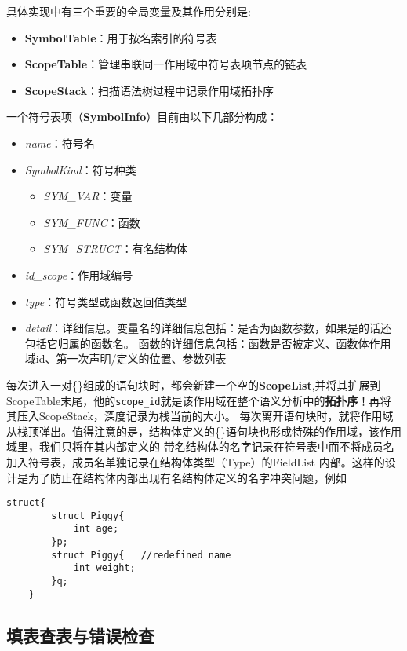 \documentclass[twocolumn]{article}
\begin{document}
具体实现中有三个重要的全局变量及其作用分别是:
\begin{itemize}
    \item \textbf{SymbolTable}：用于按名索引的符号表
    \item \textbf{ScopeTable}：管理串联同一作用域中符号表项节点的链表
    \item \textbf{ScopeStack}：扫描语法树过程中记录作用域拓扑序
\end{itemize}
一个符号表项（\textbf{SymbolInfo}）目前由以下几部分构成：
\begin{itemize}
    \item \textit{name}：符号名
    \item \textit{SymbolKind}：符号种类

          \begin{itemize}
              \item \textit{SYM\_VAR}：变量
              \item \textit{SYM\_FUNC}：函数
              \item \textit{SYM\_STRUCT}：有名结构体
          \end{itemize}
    \item \textit{id\_scope}：作用域编号
    \item \textit{type}：符号类型或函数返回值类型
    \item \textit{detail}：详细信息。变量名的详细信息包括：是否为函数参数，如果是的话还包括它归属的函数名。
          函数的详细信息包括：函数是否被定义、函数体作用域id、第一次声明/定义的位置、参数列表
\end{itemize}
每次进入一对\{\}组成的语句块时，都会新建一个空的\textbf{ScopeList},并将其扩展到
ScopeTable末尾，他的\verb|scope_id|就是该作用域在整个语义分析中的\textbf{拓扑序}！再将其压入ScopeStack，深度记录为栈当前的大小。
每次离开语句块时，就将作用域从栈顶弹出。值得注意的是，结构体定义的\{\}语句块也形成特殊的作用域，该作用域里，我们只将在其内部定义的
带名结构体的名字记录在符号表中而不将成员名加入符号表，成员名单独记录在结构体类型（Type）的FieldList
内部。这样的设计是为了防止在结构体内部出现有名结构体定义的名字冲突问题，例如
\begin{lstlisting}[style = style1]
    struct{
        struct Piggy{
            int age;
        }p;
        struct Piggy{   //redefined name
            int weight;
        }q;
    }
\end{lstlisting}


\subsection{填表查表与错误检查}
\end{document}
